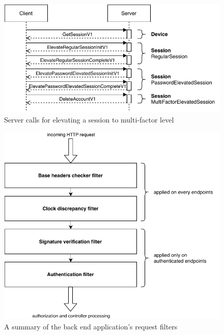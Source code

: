 \begin{figure}[!htb]
    \includegraphics[width=\textwidth]{figures/elevate-to-mfa-session.pdf}
    \caption{Server calls for elevating a session to multi-factor level}
    \label{fig:elevate-to-mfa-session}
\end{figure}

\begin{figure}[!htb]
    \includegraphics[width=\textwidth]{figures/request-filters.pdf}
    \caption{A summary of the back end application's request filters}
    \label{fig:request-filters}
\end{figure}

